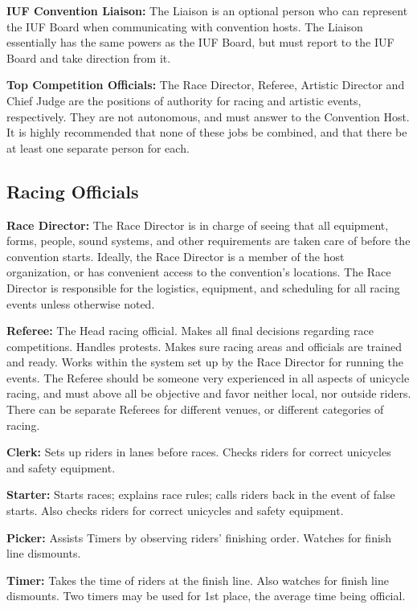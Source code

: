\textbf{IUF Convention Liaison:} The Liaison is an optional person who can represent the IUF Board when communicating with convention hosts.
The Liaison essentially has the same powers as the IUF Board, but must report to the IUF Board and take direction from it.

\textbf{Top Competition Officials:} The Race Director, Referee, Artistic Director and Chief Judge are the positions of authority for racing and artistic events, respectively.
They are not autonomous, and must answer to the Convention Host.
It is highly recommended that none of these jobs be combined, and that there be at least one separate person for each.

\subsection{Racing Officials}
\textbf{Race Director:} The Race Director is in charge of seeing that all equipment, forms, people, sound systems, and other requirements are taken care of before the convention starts.
Ideally, the Race Director is a member of the host organization, or has convenient access to the convention's locations.
The Race Director is responsible for the logistics, equipment, and scheduling for all racing events unless otherwise noted.

\textbf{Referee:} The Head racing official.
Makes all final decisions regarding race competitions.
Handles protests.
Makes sure racing areas and officials are trained and ready.
Works within the system set up by the Race Director for running the events.
The Referee should be someone very experienced in all aspects of unicycle racing, and must above all be objective and favor neither local, nor outside riders.
There can be separate Referees for different venues, or different categories of racing.

\textbf{Clerk:} Sets up riders in lanes before races.
Checks riders for correct unicycles and safety equipment.

\textbf{Starter:} Starts races; explains race rules; calls riders back in the event of false starts.
Also checks riders for correct unicycles and safety equipment.

\textbf{Picker:} Assists Timers by observing riders' finishing order.
Watches for finish line dismounts.

\textbf{Timer:} Takes the time of riders at the finish line.
Also watches for finish line dismounts.
Two timers may be used for 1st place, the average time being official.

